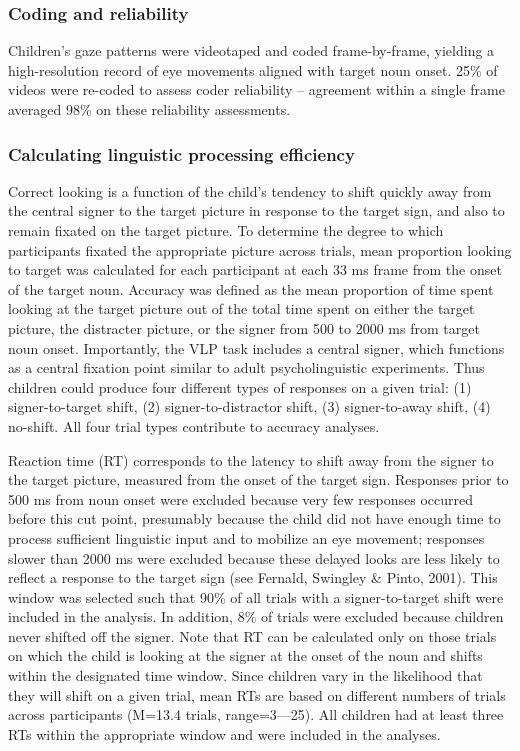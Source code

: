 \documentclass[12pt,]{article}
\begin{document}
\subsubsection{Coding and reliability}\label{coding-and-reliability}

Children's gaze patterns were videotaped and coded frame-by-frame,
yielding a high-resolution record of eye movements aligned with target
noun onset. 25\% of videos were re-coded to assess coder reliability --
agreement within a single frame averaged 98\% on these reliability
assessments.

\subsubsection{Calculating linguistic processing
efficiency}\label{calculating-linguistic-processing-efficiency}

Correct looking is a function of the child's tendency to shift quickly
away from the central signer to the target picture in response to the
target sign, and also to remain fixated on the target picture. To
determine the degree to which participants fixated the appropriate
picture across trials, mean proportion looking to target was calculated
for each participant at each 33 ms frame from the onset of the target
noun. Accuracy was defined as the mean proportion of time spent looking
at the target picture out of the total time spent on either the target
picture, the distracter picture, or the signer from 500 to 2000 ms from
target noun onset. Importantly, the VLP task includes a central signer,
which functions as a central fixation point similar to adult
psycholinguistic experiments. Thus children could produce four different
types of responses on a given trial: (1) signer-to-target shift, (2)
signer-to-distractor shift, (3) signer-to-away shift, (4) no-shift. All
four trial types contribute to accuracy analyses.

Reaction time (RT) corresponds to the latency to shift away from the
signer to the target picture, measured from the onset of the target
sign. Responses prior to 500 ms from noun onset were excluded because
very few responses occurred before this cut point, presumably because
the child did not have enough time to process sufficient linguistic
input and to mobilize an eye movement; responses slower than 2000 ms
were excluded because these delayed looks are less likely to reflect a
response to the target sign (see Fernald, Swingley \& Pinto, 2001). This
window was selected such that 90\% of all trials with a signer-to-target
shift were included in the analysis. In addition, 8\% of trials were
excluded because children never shifted off the signer. Note that RT can
be calculated only on those trials on which the child is looking at the
signer at the onset of the noun and shifts within the designated time
window. Since children vary in the likelihood that they will shift on a
given trial, mean RTs are based on different numbers of trials across
participants (M=13.4 trials, range=3---25). All children had at least
three RTs within the appropriate window and were included in the
analyses.
\end{document}
